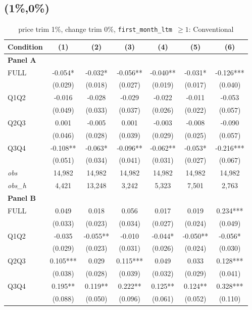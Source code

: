 \subsection{(1\%,0\%)}
\begin{table}[!htbp]
\centering
\caption{price trim 1\%, change trim 0\%, \texttt{first\_month\_ltm $\geq 1$}: Conventional}
\label{tab:abc:trim10:ltm1:conventional:bal}
\small
\begin{tabular}{lcccccc}
\toprule
Condition & (1) & (2) & (3) & (4) & (5) & (6) \\
\midrule
\textbf{Panel A} &&&&&&  \\

FULL & -0.054* & -0.032* & -0.056** & -0.040** & -0.031* & -0.126*** \\
 & (0.029) & (0.018) & (0.027) & (0.019) & (0.017) & (0.040) \\
Q1Q2 & -0.016 & -0.028 & -0.029 & -0.022 & -0.011 & -0.053 \\
 & (0.049) & (0.033) & (0.037) & (0.026) & (0.022) & (0.057) \\
Q2Q3 & 0.001 & -0.005 & 0.001 & -0.003 & -0.008 & -0.090 \\
 & (0.046) & (0.028) & (0.039) & (0.029) & (0.025) & (0.057) \\
Q3Q4 & -0.108** & -0.063* & -0.096** & -0.062** & -0.053* & -0.216*** \\
 & (0.051) & (0.034) & (0.041) & (0.031) & (0.027) & (0.067) \\

\textit{obs} & 14,982 & 14,982 & 14,982 & 14,982 & 14,982 & 14,982 \\
\textit{obs\_h} &  4,421 & 13,248 &  3,242 &  5,323 &  7,501 &  2,763 \\

\textbf{Panel B} &&&&&&  \\

FULL & 0.049 & 0.018 & 0.056 & 0.017 & 0.019 & 0.234*** \\
 & (0.033) & (0.023) & (0.034) & (0.027) & (0.024) & (0.049) \\
Q1Q2 & -0.035 & -0.055** & -0.010 & -0.044* & -0.050** & -0.056* \\
 & (0.029) & (0.023) & (0.031) & (0.026) & (0.024) & (0.030) \\
Q2Q3 & 0.105*** & 0.029 & 0.115*** & 0.049 & 0.033 & 0.128*** \\
 & (0.038) & (0.028) & (0.039) & (0.032) & (0.029) & (0.041) \\
Q3Q4 & 0.195** & 0.119** & 0.222** & 0.125** & 0.124** & 0.328*** \\
 & (0.088) & (0.050) & (0.096) & (0.061) & (0.052) & (0.110) \\


\end{tabular}
\end{table}
